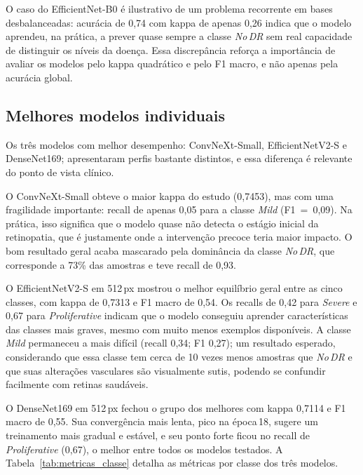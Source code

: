 \documentclass[conference]{IEEEtran}
\begin{document}
O caso do EfficientNet-B0 é ilustrativo de um problema recorrente em
bases desbalanceadas: acurácia de 0,74 com kappa de apenas 0,26
indica que o modelo aprendeu, na prática, a prever quase sempre a
classe \textit{No\,DR} sem real capacidade de distinguir os níveis da
doença. Essa discrepância reforça a importância de avaliar
os modelos pelo kappa quadrático e pelo F1 macro, e não apenas pela
acurácia global.

\subsection{Melhores modelos individuais}

Os três modelos com melhor desempenho: ConvNeXt-Small,
EfficientNetV2-S e DenseNet169; apresentaram perfis bastante
distintos, e essa diferença é relevante do ponto de vista
clínico.

O ConvNeXt-Small obteve o maior kappa do estudo (0,7453), mas com uma
fragilidade importante: recall de apenas 0,05 para a classe
\textit{Mild} (F1~=~0,09). Na prática, isso significa que o modelo
quase não detecta o estágio inicial da retinopatia, que é
justamente onde a intervenção precoce teria maior impacto. O bom
resultado geral acaba mascarado pela dominância da classe
\textit{No\,DR}, que corresponde a 73\% das amostras e teve recall de
0,93.

O EfficientNetV2-S em 512\,px mostrou o melhor equilíbrio geral entre
as cinco classes, com kappa de 0,7313 e F1 macro de 0,54. Os recalls de
0,42 para \textit{Severe} e 0,67 para \textit{Proliferative} indicam
que o modelo conseguiu aprender características das classes mais
graves, mesmo com muito menos exemplos disponíveis. A classe
\textit{Mild} permaneceu a mais difícil (recall 0,34; F1 0,27);
um resultado esperado, considerando que essa classe tem cerca de 10
vezes menos amostras que \textit{No\,DR} e que suas alterações
vasculares são visualmente sutis, podendo se confundir facilmente com
retinas saudáveis.

O DenseNet169 em 512\,px fechou o grupo dos melhores com kappa 0,7114 e
F1 macro de 0,55. Sua convergência mais lenta, pico na
época\,18, sugere um treinamento mais gradual e estável, e seu
ponto forte ficou no recall de \textit{Proliferative} (0,67), o melhor
entre todos os modelos testados. A Tabela~\ref{tab:metricas_classe}
detalha as métricas por classe dos três modelos.
\end{document}
